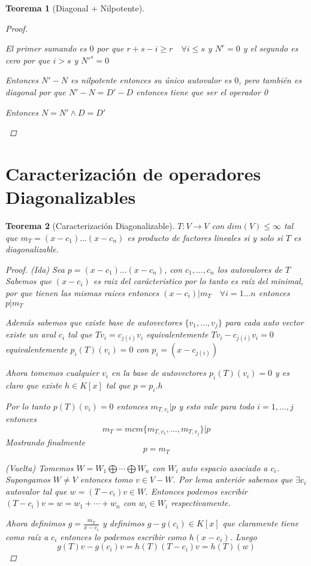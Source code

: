 \documentclass{article}
\theoremstyle{break}
\newtheorem{theorem}{Teorema}[section]
\begin{document}
\begin{theorem}[Diagonal + Nilpotente]
\begin{proof}
\begin{enumerate}
        El primer sumando es $0$ por que $r+s-i \geq r \quad \forall i\leq s$ y $N^r = 0$ y el segundo es cero por que $i > s$
        y $N'^s = 0$ 

        Entonces $N'-N$ es nilpotente entonces su único autovalor es $0$, pero también es diagonal por que
         $N'-N = D' - D$ entonces tiene que ser el operador 0

        Entonces $N=N' \land D=D'$
    \end{enumerate}
  \end{proof}
\end{theorem}

\section{Caracterización de operadores Diagonalizables}
\begin{theorem}[Caracterización Diagonalizable]
  $T: V \rightarrow V$ con $dim(V) \leq \infty$ tal que $m_T = (x-c_1)\ldots (x-c_n)$ es producto de factores lineales si y solo si
  $T$ es diagonalizable.

  \begin{proof}
    (Ida) Sea $p = (x-c_1)\ldots(x-c_n)$, con $c_1,\ldots,c_n$ los autovalores de $T$ Sabemos que $(x-c_i)$ es raiz del carácteristico por lo tanto es raíz del minimal, por que tienen
    las mismas raices entonces $(x-c_i)|m_T \quad \forall i=1\ldots n$ entonces $p|m_T$


    Además sabemos que existe base de autovectores $\{v_1,\ldots,v_j\}$ para cada auto vector existe un aval $c_i$ tal que 
    $Tv_i = c_{j(i)}v_i$ equivalentemente $Tv_i - c_{j(i)}v_i = 0$ equivalentemente $p_i(T)(v_i) = 0$ con $p_i = (x-c_{j(i)})$

    Ahora tomemos cualquier $v_i$ en la base de autovectores $p_i(T)(v_i) = 0$ y es claro que existe $h\in K[x]$ tal que $p = p_i.h$ 

    Por lo tanto $p(T)(v_i) = 0$ entonces $m_{T,v_i}|p$ y esto vale para todo $i=1,\ldots,j$ entonces 
    $$m_T = mcm\{m_{T,v_1},\ldots,m_{T,v_j}\} |p $$ Mostrando finalmente $$p=m_T$$

    (Vuelta) Tomemos $W = W_1 \bigoplus \cdots \bigoplus W_n$ con $W_i$ auto espacio asociado a $c_i$. Supongamos $W\neq V$ entonces 
    tomo $v\in V- W$. Por lema anteriór sabemos que $\exists c_i$ autovalor tal que $w = (T-c_i)v \in W$. Entonces podemos escribir
    $(T-c_i)v = w = w_1 + \cdots + w_n$ con $w_i \in W_i$ respectivamente. 

    Ahora definimos $g = \frac{m_T}{x-c_i}$ y definimos $g - g(c_i) \in K[x]$ que claramente tiene
    como raíz a $c_i$ entonces lo podemos escribir como $h(x-c_i)$. Luego $$ g(T)v - g(c_i)v = h(T)(T-c_i)v = h(T)(w)$$


\end{proof}
\end{theorem}
\end{document}
